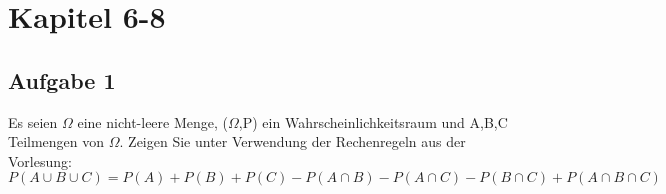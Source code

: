 \section{Kapitel 6-8}

\subsection*{Aufgabe 1}
Es seien $\Omega$ eine nicht-leere Menge, ($\Omega$,P) ein Wahrscheinlichkeitsraum und A,B,C Teilmengen von $\Omega$. Zeigen Sie unter Verwendung der Rechenregeln aus der Vorlesung:
\newline
$P(A \cup B \cup C) = P(A) + P(B) + P(C) - P(A \cap B) - P(A \cap C) - P(B \cap C) + P(A \cap B \cap C)$

